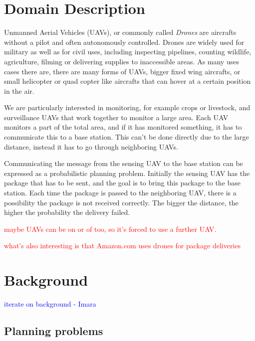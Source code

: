 \documentclass[runningheads,a4paper]{llncs}
\newcommand\myworries[1]{\textcolor{red}{#1}}
\newcommand\todo[1]{\textcolor{blue}{#1}}
\begin{document}

\section{Domain Description}
\label{sec:domaind}

Unmanned Aerial Vehicles (UAVs), or commonly called \emph{Drones} are aircrafts
without a pilot and often autonomously controlled. Drones are widely used for
military as well as for civil uses, including inspecting pipelines, counting
wildlife, agriculture, filming or delivering supplies to inaccessible areas.
As many uses cases there are, there are many forms of UAVs, bigger fixed wing
aircrafts, or small helicopter or quad copter like aircrafts that can hover at
a certain position in the air.

We are particularly interested in monitoring, for example crops or livestock,
and surveillance UAVs that work together to monitor a large area. Each UAV
monitors a part of the total area, and if it has monitored something, it has
to communicate this to a base station. This can't be done directly due to the
large distance, instead it has to go through neighboring UAVs.

Communicating the message from the sensing UAV to the base station can be
expressed as a probabilistic planning problem. Initially the sensing UAV
has the package that has to be sent, and the goal is to bring this package to
the base station. Each time the package is passed to the neighboring UAV,
there is a possibility the package is not received correctly. The bigger the
distance, the higher the probability the delivery failed.

\myworries{maybe UAVs can be on or of too, so it's forced to use a further UAV.}

\myworries{what's also interesting is that Amazon.com uses drones for package deliveries}


\section{Background}
\label{sec:background}

\todo{iterate on background - Imara}
\subsection{Planning problems}
\end{document}
